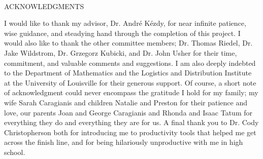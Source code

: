 \begin{center}
~\\
\vspace{1in}
ACKNOWLEDGMENTS\\
\end{center}

I would like to thank my advisor, Dr. Andr\'e K\'ezdy, for near infinite patience, wise guidance, and steadying hand through the completion of this project.  I would also like to thank the other committee members; Dr. Thomas Riedel, Dr. Jake Wildstrom, Dr. Grzegorz Kubicki, and Dr. John Usher for their time, commitment, and valuable comments and suggestions.  I am also deeply indebted to the Department of Mathematics and the Logistics and Distribution Institute at the University of Louisville for their generous support.  Of course, a short note of acknowledgment could never encompass the gratitude I hold for my family;  my wife Sarah Caragianis and children Natalie and Preston for their patience and love, our parents Joan and George Caragianis and Rhonda and Isaac Tatum for everything they do and everything they are for us.    A final thank you to Dr. Cody Christopherson both for introducing me to productivity tools that helped me get across the finish line, and for being hilariously unproductive with me in high school.

